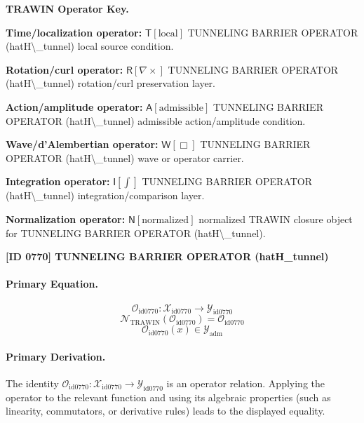 \par\vspace{0.45\baselineskip}
\noindent\begin{minipage}[t]{\linewidth}
\begingroup
\small
\raggedright
\textbf{TRAWIN Operator Key.}\par
\noindent\textbf{Time/localization operator:} $\mathsf{T}\!\left[\mathrm{local}\right]$ TUNNELING BARRIER OPERATOR (hatH\textbackslash{}\_tunnel) local source condition.\par
\noindent\textbf{Rotation/curl operator:} $\mathsf{R}\!\left[\nabla\times\right]$ TUNNELING BARRIER OPERATOR (hatH\textbackslash{}\_tunnel) rotation/curl preservation layer.\par
\noindent\textbf{Action/amplitude operator:} $\mathsf{A}\!\left[\mathrm{admissible}\right]$ TUNNELING BARRIER OPERATOR (hatH\textbackslash{}\_tunnel) admissible action/amplitude condition.\par
\noindent\textbf{Wave/d'Alembertian operator:} $\mathsf{W}\!\left[\Box\right]$ TUNNELING BARRIER OPERATOR (hatH\textbackslash{}\_tunnel) wave or operator carrier.\par
\noindent\textbf{Integration operator:} $\mathsf{I}\!\left[\int\right]$ TUNNELING BARRIER OPERATOR (hatH\textbackslash{}\_tunnel) integration/comparison layer.\par
\noindent\textbf{Normalization operator:} $\mathsf{N}\!\left[\mathrm{normalized}\right]$ normalized TRAWIN closure object for TUNNELING BARRIER OPERATOR (hatH\textbackslash{}\_tunnel).\par
\endgroup
\end{minipage}

\clearpage
\noindent\textbf{[ID 0770] TUNNELING BARRIER OPERATOR (hatH\_tunnel)}\par
\vspace{0.35em}
\paragraph{Primary Equation.}
\[
\mathcal{O}_{\mathrm{id0770}}:\mathcal{X}_{\mathrm{id0770}}\longrightarrow\mathcal{Y}_{\mathrm{id0770}}
\]
\[
\mathcal{N}_{\mathrm{TRAWIN}}(\mathcal{O}_{\mathrm{id0770}})=\mathcal{O}_{\mathrm{id0770}}
\]
\[
\mathcal{O}_{\mathrm{id0770}}(x)\in\mathcal{Y}_{\mathrm{adm}}
\]

\paragraph{Primary Derivation.}
The identity \( \mathcal{O}_{\mathrm{id0770}}:\mathcal{X}_{\mathrm{id0770}}\longrightarrow\mathcal{Y}_{\mathrm{id0770}} \) is an operator relation. Applying the operator to the relevant function and using its algebraic properties (such as linearity, commutators, or derivative rules) leads to the displayed equality.
